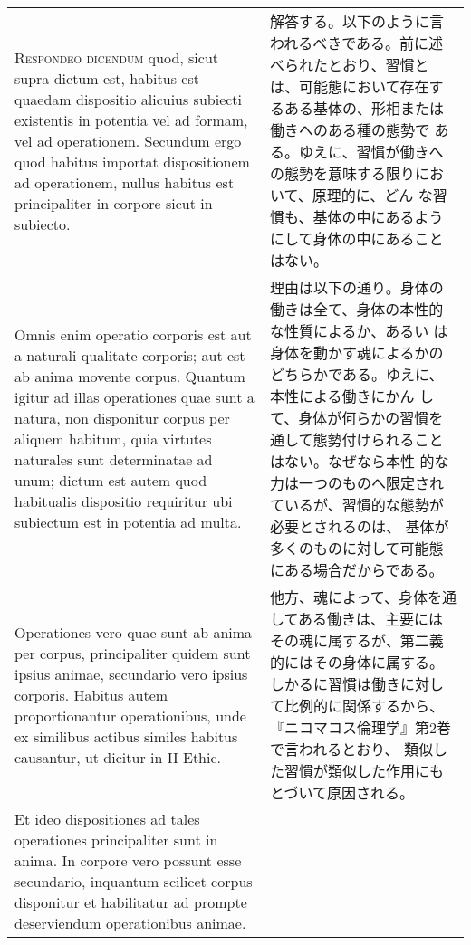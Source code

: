 \documentclass[10pt]{jsarticle} %
\begin{document}
\begin{longtable}{p{21em}p{21em}}
\\



{\scshape Respondeo dicendum} quod, sicut supra dictum est, habitus est quaedam
dispositio alicuius subiecti existentis in potentia vel ad formam, vel
ad operationem. Secundum ergo quod habitus importat dispositionem ad
operationem, nullus habitus est principaliter in corpore sicut in
subiecto. 


&

解答する。以下のように言われるべきである。前に述べられたとおり、習慣と
は、可能態において存在するある基体の、形相または働きへのある種の態勢で
ある。ゆえに、習慣が働きへの態勢を意味する限りにおいて、原理的に、どん
な習慣も、基体の中にあるようにして身体の中にあることはない。

\\


Omnis enim operatio corporis est aut a naturali qualitate
corporis; aut est ab anima movente corpus. Quantum igitur ad illas
operationes quae sunt a natura, non disponitur corpus per aliquem
habitum, quia virtutes naturales sunt determinatae ad unum; dictum est
autem quod habitualis dispositio requiritur ubi subiectum est in
potentia ad multa. 



&

理由は以下の通り。身体の働きは全て、身体の本性的な性質によるか、あるい
は身体を動かす魂によるかのどちらかである。ゆえに、本性による働きにかん
して、身体が何らかの習慣を通して態勢付けられることはない。なぜなら本性
的な力は一つのものへ限定されているが、習慣的な態勢が必要とされるのは、
基体が多くのものに対して可能態にある場合だからである。


\\


Operationes vero quae sunt ab anima per corpus,
principaliter quidem sunt ipsius animae, secundario vero ipsius
corporis. Habitus autem proportionantur operationibus, unde ex
similibus actibus similes habitus causantur, ut dicitur in II
Ethic. 



&

他方、魂によって、身体を通してある働きは、主要にはその魂に属するが、第二義的にはその身体に属する。
しかるに習慣は働きに対して比例的に関係するから、『ニコマコス倫理学』第2巻で言われるとおり、
類似した習慣が類似した作用にもとづいて原因される。

\\


Et ideo dispositiones ad tales operationes principaliter sunt
in anima. In corpore vero possunt esse secundario, inquantum scilicet
corpus disponitur et habilitatur ad prompte deserviendum operationibus
animae.



\end{longtable}
\end{document}
